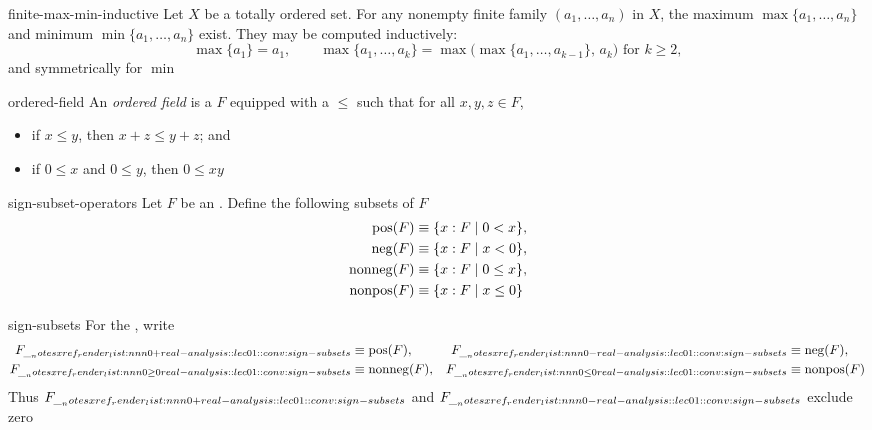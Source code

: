 \documentclass[12pt]{article}
\begin{document}
\begin{prop}{finite-max-min-inductive}
  Let \(X\) be a totally ordered set. For any nonempty finite family \((a_1, \ldots, a_n)\) in \(X\), the maximum \(\max\{a_1, \ldots, a_n\}\) and minimum \(\min\{a_1, \ldots, a_n\}\) exist. They may be computed inductively:
  \[
    \max\{a_1\} = a_1, \qquad \max\{a_1, \ldots, a_k\} = \max\bigl(\max\{a_1, \ldots, a_{k-1}\},\, a_k\bigr) \text{ for } k \geq 2,
  \]
  and symmetrically for \(\min\)
\end{prop}

\begin{dfn}
{ordered-field}
  An \emph{ordered field} is a  \(F\) equipped with a
   \(\leq\) such that for all
  \(x,y,z\in F\),
  \begin{itemize}[nosep]
    \item if \(x\leq y\), then \(x+z\leq y+z\); and
    \item if \(0\leq x\) and \(0\leq y\), then \(0\leq xy\)
  \end{itemize} 
\end{dfn}

\begin{dfn}{sign-subset-operators}
  Let \(F\) be an . Define
  the following subsets of \(F\)
  \[
    \begin{aligned}
      \mathrm{pos}(F)&\equiv\{x:F\mid0<x\},\\
      \mathrm{neg}(F)&\equiv\{x:F\mid x<0\},\\
      \mathrm{nonneg}(F)&\equiv\{x:F\mid0\leq x\},\\
      \mathrm{nonpos}(F)&\equiv\{x:F\mid x\leq0\}
    \end{aligned}
  \]
\end{dfn}

\begin{conv}{sign-subsets}
  For the , write
  \[
    \begin{aligned}
      \apos{F}&\defeq\mathrm{pos}(F),&
      \aneg{F}&\defeq\mathrm{neg}(F),\\
      \agez{F}&\defeq\mathrm{nonneg}(F),&
      \alez{F}&\defeq\mathrm{nonpos}(F)
    \end{aligned}
  \]
  Thus \(\apos{F}\) and \(\aneg{F}\) exclude zero
  \par\smallskip{}
  \par{}
\end{conv}
\end{document}
